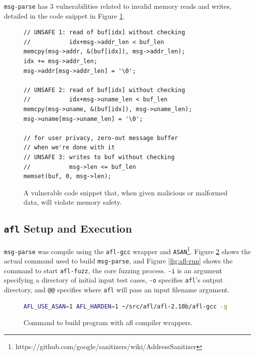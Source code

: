 \texttt{msg-parse} has 3 vulnerabilities related to invalid memory reads
and writes, detailed in the code snippet in Figure \ref{fig:vuln-snippet}. \\

\begin{figure}[H]
    \begin{lstlisting}[language={[ANSI]C}]
// UNSAFE 1: read of buf[idx] without checking
//           idx+msg->addr_len < buf_len
memcpy(msg->addr, &(buf[idx]), msg->addr_len);
idx += msg->addr_len;
msg->addr[msg->addr_len] = '\0';

// UNSAFE 2: read of buf[idx] without checking
//           idx+msg->uname_len < buf_len
memcpy(msg->uname, &(buf[idx]), msg->uname_len);
msg->uname[msg->uname_len] = '\0';                                         

// for user privacy, zero-out message buffer
// when we're done with it
// UNSAFE 3: writes to buf without checking
//           msg->len <= buf_len
memset(buf, 0, msg->len);
\end{lstlisting}
\caption{A vulnerable code snippet that, when given malicious or malformed data, will violate memory safety.}
\label{fig:vuln-snippet}
\end{figure}

\subsection{\texttt{afl} Setup and Execution}

\texttt{msg-parse} was compile using the \texttt{afl-gcc} wrapper and
\texttt{ASAN}\footnote{https://github.com/google/sanitizers/wiki/AddressSanitizer}.
Figure \ref{fig:afl-build} shows the actual command used to build \texttt{msg-parse},
and Figure \ref{fig:afl-run} shows the command to start \texttt{afl-fuzz}, the
core fuzzing process. \texttt{-i} is an argument specifying a directory of
initial input test cases, \texttt{-o} specifies \texttt{afl}'s output
directory, and \texttt{@@} specifies where \texttt{afl} will pass an input
filename argument.

\begin{figure}[H]
    \begin{lstlisting}[language=bash]
AFL_USE_ASAN=1 AFL_HARDEN=1 ~/src/afl/afl-2.10b/afl-gcc -g -Wall -m32 msg-parse.c
\end{lstlisting}
\caption{Command to build program with afl compiler wrappers.}
\label{fig:afl-build}
\end{figure}

